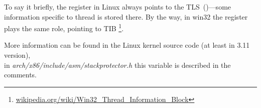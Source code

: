 To say it briefly, the  register in Linux always points to the
\ac{TLS}~()---some information specific to thread is stored there.
By the way, in win32 the  register plays the same role, pointing to
\ac{TIB} \footnote{\href{http://go.yurichev.com/17104}{wikipedia.org/wiki/Win32\_Thread\_Information\_Block}}. 

More information can be found in the Linux kernel source code (at least in 3.11 version),\\
in \emph{arch/x86/include/asm/stackprotector.h} this variable is described in the comments.



